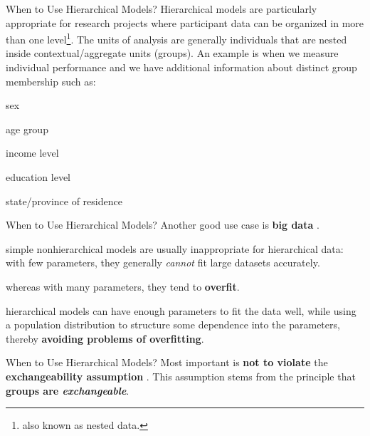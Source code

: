\begin{frame}{When to Use Hierarchical Models?}
	Hierarchical models are particularly appropriate for research projects
	where participant data can be organized in more than one level\footnote{
		also known as nested data.}.
	The units of analysis are generally individuals that are nested inside
	contextual/aggregate units (groups).
	\vfill
	\small
	An example is when we measure individual performance
	and we have additional information about distinct group membership such as:
	\begin{vfilleditems}
		\item \small sex
		\item \small age group
		\item \small income level
		\item \small education level
		\item \small state/province of residence
	\end{vfilleditems}
\end{frame}

\begin{frame}{When to Use Hierarchical Models?}
	Another good use case is \textbf{big data} \parencite{gelman2013bayesian}.
	\begin{vfilleditems}
		\item simple nonhierarchical models are usually inappropriate for hierarchical data:
		with few parameters,
		they generally \textit{cannot} fit large datasets accurately.
		\item whereas with many parameters, they tend to \textbf{overfit}.
		\item hierarchical models can have enough parameters to fit the data well,
		while using a population distribution to structure some dependence into the parameters,
		thereby \textbf{avoiding problems of overfitting}.
	\end{vfilleditems}
\end{frame}

\begin{frame}{When to Use Hierarchical Models?}
	Most important is \textbf{not to violate} the \textbf{exchangeability assumption}
	\parencite{definettiTheoryProbability1974}.
	\vfill
	This assumption stems from the principle that \textbf{groups are \textit{exchangeable}}.
\end{frame}

